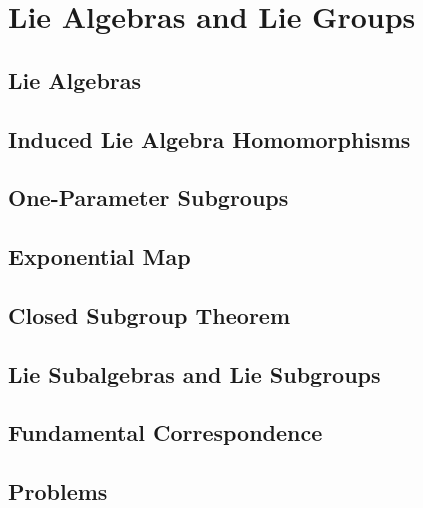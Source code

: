 \chapter{Lie Algebras and Lie Groups}
\section{Lie Algebras}
\section{Induced Lie Algebra Homomorphisms}
\section{One-Parameter Subgroups}
\section{Exponential Map}
\section{Closed Subgroup Theorem}
\section{Lie Subalgebras and Lie Subgroups}
\section{Fundamental Correspondence}
\section{Problems}